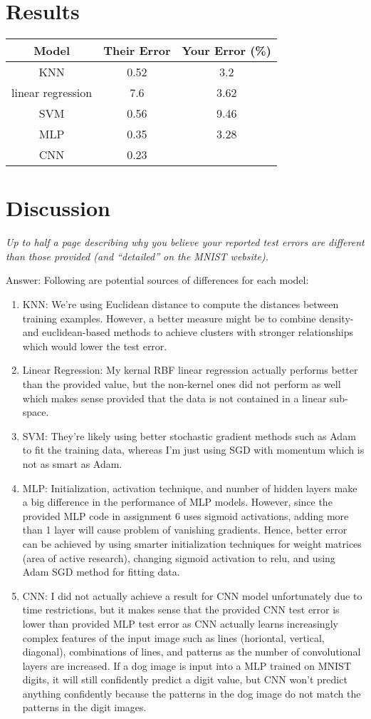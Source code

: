 \documentclass{article}
\def\ans#1{\par\gre{Answer: #1}}{}
\def\gre#1{{\color{gre}#1}}
\def\enum#1{\begin{enumerate}#1\end{enumerate}}
\begin{document}
\section{Results}
\begin{center}
 \begin{tabular}{|c | c | c|} 
 \hline
 Model & Their Error & Your Error (\%) \\ [0.5ex]
 \hline\hline
 KNN & 0.52 & 3.2 \\
 linear regression & 7.6 & 3.62 \\
 SVM & 0.56 & 9.46 \\
 MLP & 0.35 & 3.28\\
 CNN & 0.23 & \\ 
 \hline
\end{tabular}
\end{center}

\section{Discussion}
\emph{Up to half a page describing why you believe your reported test errors are different than those provided (and ``detailed'' on the MNIST website).}

\ans{
Following are potential sources of differences for each model:
\enum{
\item KNN: We're using Euclidean distance to compute the distances between training examples. However, a better measure might be to combine density- and euclidean-based methods to achieve clusters with stronger relationships which would lower the test error.
\item Linear Regression: My kernal RBF linear regression actually performs better than the provided value, but the non-kernel ones did not perform as well which makes sense provided that the data is not contained in a linear sub-space.
\item SVM: They're likely using better stochastic gradient methods such as Adam to fit the training data, whereas I'm just using SGD with momentum which is not as smart as Adam.
\item MLP: Initialization, activation technique, and number of hidden layers make a big difference in the performance of MLP models. However, since the provided MLP code in assignment 6 uses sigmoid activations, adding more than 1 layer will cause problem of vanishing gradients. Hence, better error can be achieved by using smarter initialization techniques for weight matrices (area of active research), changing sigmoid activation to relu, and using Adam SGD method for fitting data. 
\item CNN: I did not actually achieve a result for CNN model unfortunately due to time restrictions, but it makes sense that the provided CNN test error is lower than provided MLP test error as CNN actually learns increasingly complex features of the input image such as lines (horiontal, vertical, diagonal), combinations of lines, and patterns as the number of convolutional layers are increased. If a dog image is input into a MLP trained on MNIST digits, it will still confidently predict a digit value, but CNN won't predict anything confidently because the patterns in the dog image do not match the patterns in the digit images.
}
}
\end{document}
